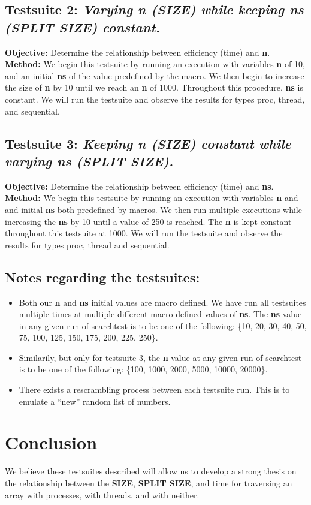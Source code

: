 \documentclass{article}
\begin{document}
        \subsection{Testsuite 2: \textit{Varying n (SIZE) while keeping ns (SPLIT SIZE) constant.}}
            \textbf{Objective:} Determine the relationship between efficiency (time) and \textbf{n}. \newline
            \textbf{Method:} We begin this testsuite by running an execution with variables \textbf{n} of 10, and an initial \textbf{ns} of the value predefined by the macro. We then begin to increase the size of \textbf{n} by 10 until we reach an \textbf{n} of 1000. Throughout this procedure, \textbf{ns} is constant. \newline
            We will run the testsuite and observe the results for types proc, thread, and sequential.
        \subsection{Testsuite 3: \textit{Keeping n (SIZE) constant while varying ns (SPLIT SIZE).}}
            \textbf{Objective:} Determine the relationship between efficiency (time) and \textbf{ns}. \newline
            \textbf{Method:} We begin this testsuite by running an execution with variables \textbf{n} and and initial \textbf{ns} both predefined by macros. We then run multiple executions while increasing the \textbf{ns} by 10 until a value of 250 is reached. The \textbf{n} is kept constant throughout this testsuite at 1000. \newline
            We will run the testsuite and observe the results for types proc, thread and sequential.
        \subsection{Notes regarding the testsuites:}
            \begin{itemize}
                \item Both our \textbf{n} and \textbf{ns} initial values are macro defined. We have run all testsuites multiple times at multiple different macro defined values of \textbf{ns}. \newline The \textbf{ns} value in any given run of searchtest is to be one of the following: \{10, 20, 30, 40, 50, 75, 100, 125, 150, 175, 200, 225, 250\}.
                \item Similarily, but only for testsuite 3, the \textbf{n} value at any given run of searchtest is to be one of the following: \{100, 1000, 2000, 5000, 10000, 20000\}.
                \item There exists a rescrambling process between each testsuite run. This is to emulate a ``new'' random list of numbers.
            \end{itemize}
    \section{Conclusion}
        We believe these testsuites described will allow us to develop a strong thesis on the relationship between the \textbf{SIZE}, \textbf{SPLIT SIZE}, and time for traversing an array with processes, with threads, and with neither.
\end{document}

